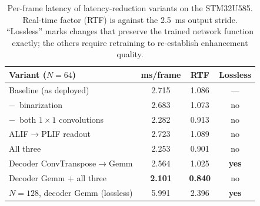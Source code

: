 
\begin{table}[!t]
\caption{Per-frame latency of latency-reduction variants on the STM32U585.
Real-time factor (RTF) is against the 2.5~ms output stride. ``Lossless''
marks changes that preserve the trained network function exactly; the
others require retraining to re-establish enhancement quality.}
\label{tab:latency-variants}
\centering
\setlength{\tabcolsep}{4pt}
\begin{tabular}{lccc}
\hline
\textbf{Variant ($N{=}64$)} & \textbf{ms/frame} & \textbf{RTF} & \textbf{Lossless} \\
\hline
Baseline (as deployed)                  & 2.715          & 1.086          & ---          \\
$-$~binarization                        & 2.683          & 1.073          & no           \\
$-$~both $1\times1$ convolutions        & 2.282          & 0.913          & no           \\
ALIF$\rightarrow$PLIF readout           & 2.723          & 1.089          & no           \\
All three                               & 2.253          & 0.901          & no           \\
Decoder ConvTranspose$\rightarrow$Gemm  & 2.564          & 1.025          & \textbf{yes} \\
Decoder Gemm $+$ all three              & \textbf{2.101} & \textbf{0.840} & no           \\
\hline
$N{=}128$, decoder Gemm (lossless)      & 5.991          & 2.396          & \textbf{yes} \\
\hline
\end{tabular}
\end{table}

